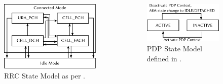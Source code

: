 \documentclass{beamer}
\begin{document}
\begin{frame}
	\begin{columns}[T]
		\begin{figure}
			\includegraphics[width=\columnwidth]{../../chapters/04-mobilenets/images/rrc-state-model.pdf}
			\caption{RRC State Model as per \cite[Section~7.1]{3gpp.25.331}.}
		\end{figure}

		\begin{figure}
			\includegraphics[width=\columnwidth]{../../chapters/04-mobilenets/images/pdp-state-model.pdf}
			\caption{PDP State Model defined in \cite[Section~9]{3gpp.23.060}.}
		\end{figure}
	\end{columns}
\end{frame}
\end{document}
